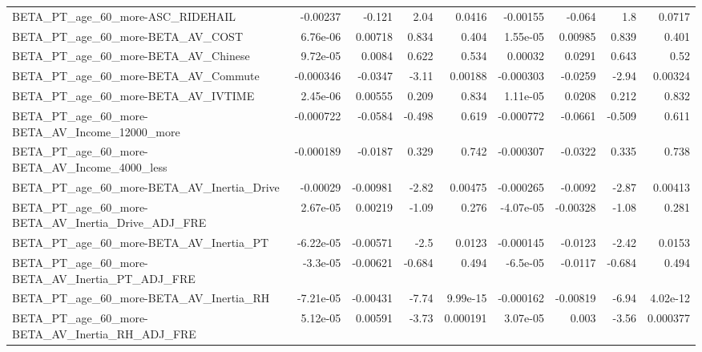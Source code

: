 \begin{tabular}{lrrrrrrrr}
BETA\_PT\_age\_60\_more-ASC\_RIDEHAIL                   &    -0.00237 &       -0.121 &     2.04 &   0.0416 &   -0.00155 &      -0.064 &          1.8 &        0.0717 \\
BETA\_PT\_age\_60\_more-BETA\_AV\_COST                   &    6.76e-06 &      0.00718 &    0.834 &    0.404 &   1.55e-05 &     0.00985 &        0.839 &         0.401 \\
BETA\_PT\_age\_60\_more-BETA\_AV\_Chinese                &    9.72e-05 &       0.0084 &    0.622 &    0.534 &    0.00032 &      0.0291 &        0.643 &          0.52 \\
BETA\_PT\_age\_60\_more-BETA\_AV\_Commute                &   -0.000346 &      -0.0347 &    -3.11 &  0.00188 &  -0.000303 &     -0.0259 &        -2.94 &       0.00324 \\
BETA\_PT\_age\_60\_more-BETA\_AV\_IVTIME                 &    2.45e-06 &      0.00555 &    0.209 &    0.834 &   1.11e-05 &      0.0208 &        0.212 &         0.832 \\
BETA\_PT\_age\_60\_more-BETA\_AV\_Income\_12000\_more      &   -0.000722 &      -0.0584 &   -0.498 &    0.619 &  -0.000772 &     -0.0661 &       -0.509 &         0.611 \\
BETA\_PT\_age\_60\_more-BETA\_AV\_Income\_4000\_less       &   -0.000189 &      -0.0187 &    0.329 &    0.742 &  -0.000307 &     -0.0322 &        0.335 &         0.738 \\
BETA\_PT\_age\_60\_more-BETA\_AV\_Inertia\_Drive          &    -0.00029 &     -0.00981 &    -2.82 &  0.00475 &  -0.000265 &     -0.0092 &        -2.87 &       0.00413 \\
BETA\_PT\_age\_60\_more-BETA\_AV\_Inertia\_Drive\_ADJ\_FRE  &    2.67e-05 &      0.00219 &    -1.09 &    0.276 &  -4.07e-05 &    -0.00328 &        -1.08 &         0.281 \\
BETA\_PT\_age\_60\_more-BETA\_AV\_Inertia\_PT             &   -6.22e-05 &     -0.00571 &     -2.5 &   0.0123 &  -0.000145 &     -0.0123 &        -2.42 &        0.0153 \\
BETA\_PT\_age\_60\_more-BETA\_AV\_Inertia\_PT\_ADJ\_FRE     &    -3.3e-05 &     -0.00621 &   -0.684 &    0.494 &   -6.5e-05 &     -0.0117 &       -0.684 &         0.494 \\
BETA\_PT\_age\_60\_more-BETA\_AV\_Inertia\_RH             &   -7.21e-05 &     -0.00431 &    -7.74 & 9.99e-15 &  -0.000162 &    -0.00819 &        -6.94 &      4.02e-12 \\
BETA\_PT\_age\_60\_more-BETA\_AV\_Inertia\_RH\_ADJ\_FRE     &    5.12e-05 &      0.00591 &    -3.73 & 0.000191 &   3.07e-05 &       0.003 &        -3.56 &      0.000377 \\

\end{tabular}
